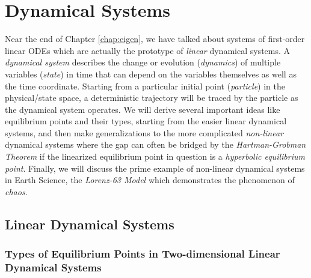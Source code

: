 \chapter{Dynamical Systems}

Near the end of Chapter \ref{chap:eigen}, we have talked about systems of first-order linear ODEs which are actually the prototype of \textit{linear} dynamical systems. A \textit{dynamical system} describes the change or evolution (\textit{dynamics}) of multiple variables (\textit{state}) in time that can depend on the variables themselves as well as the time coordinate. Starting from a particular initial point (\textit{particle}) in the physical/state space, a deterministic trajectory will be traced by the particle as the dynamical system operates. We will derive several important ideas like equilibrium points and their types, starting from the easier linear dynamical systems, and then make generalizations to the more complicated \textit{non-linear} dynamical systems where the gap can often be bridged by the \textit{Hartman-Grobman Theorem} if the linearized equilibrium point in question is a \textit{hyperbolic equilibrium point}. Finally, we will discuss the prime example of non-linear dynamical systems in Earth Science, the \textit{Lorenz-63 Model} which demonstrates the phenomenon of \textit{chaos}.

\section{Linear Dynamical Systems}

\subsection{Types of Equilibrium Points in Two-dimensional Linear Dynamical Systems}

